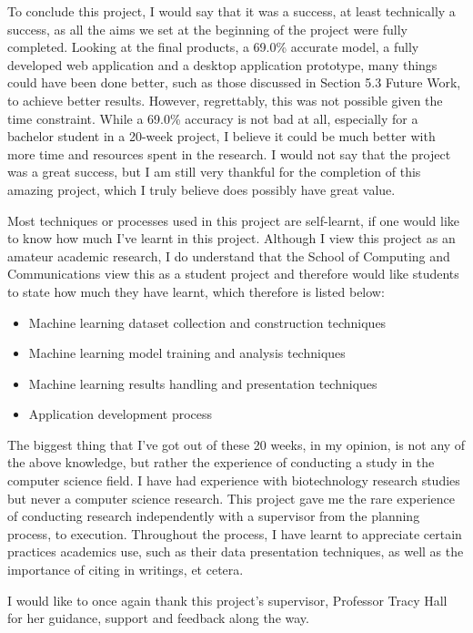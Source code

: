 \documentclass{report}
\begin{document}
To conclude this project, I would say that it was a success, at least technically a success, as all the aims we set at the beginning of the project were fully completed. Looking at the final products, a 69.0\% accurate model, a fully developed web application and a desktop application prototype, many things could have been done better, such as those discussed in Section 5.3 Future Work, to achieve better results. However, regrettably, this was not possible given the time constraint. While a 69.0\% accuracy is not bad at all, especially for a bachelor student in a 20-week project, I believe it could be much better with more time and resources spent in the research. I would not say that the project was a great success, but I am still very thankful for the completion of this amazing project, which I truly believe does possibly have great value.

Most techniques or processes used in this project are self-learnt, if one would like to know how much I’ve learnt in this project. Although I view this project as an amateur academic research, I do understand that the School of Computing and Communications view this as a student project and therefore would like students to state how much they have learnt, which therefore is listed below:

\begin{itemize}
\item Machine learning dataset collection and construction techniques
\item Machine learning model training and analysis techniques
\item Machine learning results handling and presentation techniques
\item Application development process
\end{itemize}

The biggest thing that I’ve got out of these 20 weeks, in my opinion, is not any of the above knowledge, but rather the experience of conducting a study in the computer science field. I have had experience with biotechnology research studies but never a computer science research. This project gave me the rare experience of conducting research independently with a supervisor from the planning process, to execution. Throughout the process, I have learnt to appreciate certain practices academics use, such as their data presentation techniques, as well as the importance of citing in writings, et cetera.

I would like to once again thank this project’s supervisor, Professor Tracy Hall for her guidance, support and feedback along the way.
\end{document}
